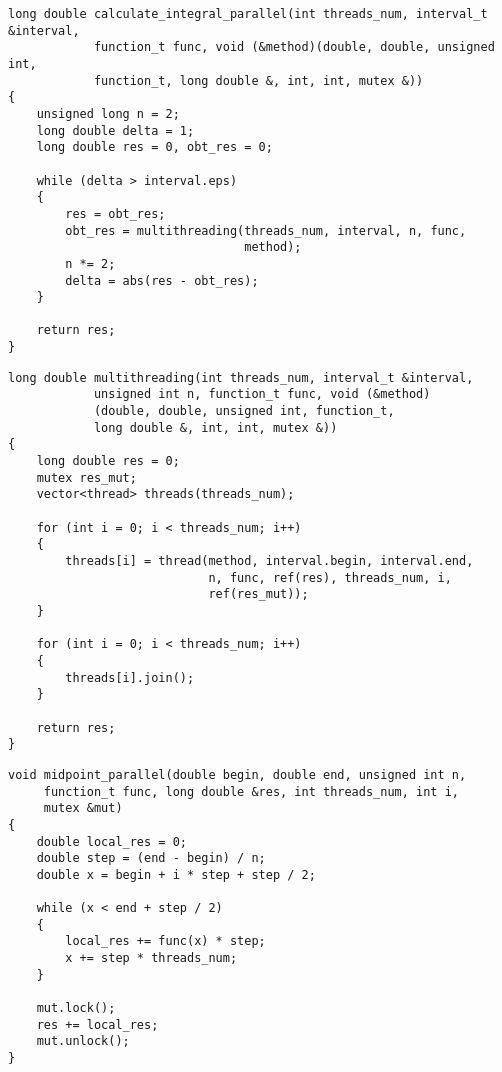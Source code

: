 \clearpage

\begin{lstlisting}[label=lst:calc-int-par, caption=Параллельный алгоритм численного интегрирования с заданной точностью]
long double calculate_integral_parallel(int threads_num, interval_t &interval, 
            function_t func, void (&method)(double, double, unsigned int, 
            function_t, long double &, int, int, mutex &))
{
    unsigned long n = 2;
    long double delta = 1;
    long double res = 0, obt_res = 0;

    while (delta > interval.eps)
    {
        res = obt_res;
        obt_res = multithreading(threads_num, interval, n, func, 
                                 method);
        n *= 2;
        delta = abs(res - obt_res);
    }

    return res;
}
\end{lstlisting}

\clearpage

\begin{lstlisting}[label=lst:multithreading, caption=Создание потоков для алгоритмов численного интегрирования]
long double multithreading(int threads_num, interval_t &interval,
            unsigned int n, function_t func, void (&method)
            (double, double, unsigned int, function_t, 
            long double &, int, int, mutex &))
{
    long double res = 0;
    mutex res_mut;
    vector<thread> threads(threads_num);

    for (int i = 0; i < threads_num; i++)
    {
        threads[i] = thread(method, interval.begin, interval.end, 
                            n, func, ref(res), threads_num, i, 
                            ref(res_mut));
    }

    for (int i = 0; i < threads_num; i++)
    {
        threads[i].join();
    }

    return res;
}
\end{lstlisting}

\clearpage

\begin{lstlisting}[label=lst:int-midpoint-par, caption=Параллельный алгоритм численного интегрирования методом средних прямоугольников при заданных n и номере потока]
void midpoint_parallel(double begin, double end, unsigned int n, 
     function_t func, long double &res, int threads_num, int i, 
     mutex &mut)
{
    double local_res = 0;
    double step = (end - begin) / n;
    double x = begin + i * step + step / 2;

    while (x < end + step / 2)
    {
        local_res += func(x) * step;
        x += step * threads_num;
    }

    mut.lock();
    res += local_res;
    mut.unlock();
}
\end{lstlisting}

